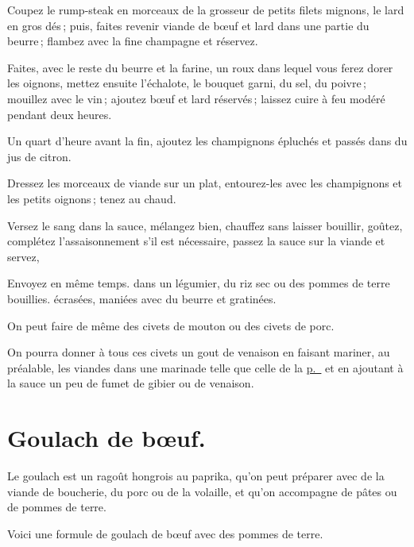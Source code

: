Coupez le rump-steak en morceaux de la grosseur de petits filets mignons, le
lard en gros dés ; puis, faites revenir viande de bœuf et lard dans une partie du
beurre ; flambez avec la fine champagne et réservez.

Faites, avec le reste du beurre et la farine, un roux dans lequel vous ferez
dorer les oignons, mettez ensuite l'échalote, le bouquet garni, du sel, du
poivre ; mouillez avec le vin ; ajoutez bœuf et lard réservés ; laissez cuire
à feu modéré pendant deux heures.

Un quart d'heure avant la fin, ajoutez les champignons épluchés et passés dans
du jus de citron.

Dressez les morceaux de viande sur un plat, entourez-les avec les champignons
et les petits oignons ; tenez au chaud.

Versez le sang dans la sauce, mélangez bien, chauffez sans laisser bouillir,
goûtez, complétez l'assaisonnement s'il est nécessaire, passez la sauce sur la
viande et servez,

Envoyez en même temps. dans un légumier, du riz sec ou des pommes de
terre bouillies. écrasées, maniées avec du beurre et gratinées.

\sk

On peut faire de même des civets de mouton ou des civets de porc.

\sk

On pourra donner à tous ces civets un gout de venaison en faisant mariner, au
préalable, les viandes dans une marinade telle que celle de la
\hyperlink{p0514}{p. \pageref{pg0514}} et en ajoutant à la sauce un peu de fumet
de gibier ou de venaison.

\section*{\centering Goulach de bœuf.}
{}

Le goulach est un ragoût hongrois au paprika, qu'on peut préparer avec de la
viande de boucherie, du porc ou de la volaille, et qu'on accompagne de pâtes ou
de pommes de terre.

Voici une formule de goulach de bœuf avec des pommes de terre.

\medskip

